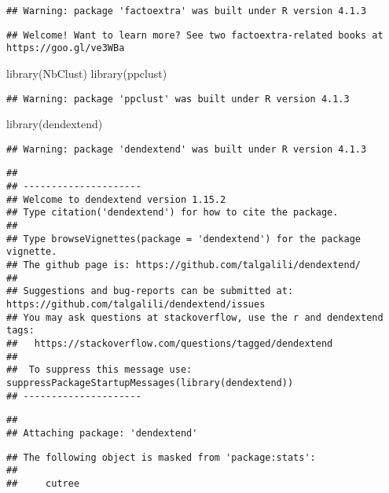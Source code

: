 \documentclass[
]{article}
\newenvironment{Shaded}{\begin{snugshade}}{\end{snugshade}}
\newcommand{\FunctionTok}[1]{\textcolor[rgb]{0.00,0.00,0.00}{#1}}
\newcommand{\NormalTok}[1]{#1}
\begin{document}
\begin{verbatim}
## Warning: package 'factoextra' was built under R version 4.1.3
\end{verbatim}

\begin{verbatim}
## Welcome! Want to learn more? See two factoextra-related books at https://goo.gl/ve3WBa
\end{verbatim}

\begin{Shaded}
\begin{Highlighting}[]
\FunctionTok{library}\NormalTok{(NbClust)}
\FunctionTok{library}\NormalTok{(ppclust)}
\end{Highlighting}
\end{Shaded}

\begin{verbatim}
## Warning: package 'ppclust' was built under R version 4.1.3
\end{verbatim}

\begin{Shaded}
\begin{Highlighting}[]
\FunctionTok{library}\NormalTok{(dendextend)}
\end{Highlighting}
\end{Shaded}

\begin{verbatim}
## Warning: package 'dendextend' was built under R version 4.1.3
\end{verbatim}

\begin{verbatim}
## 
## ---------------------
## Welcome to dendextend version 1.15.2
## Type citation('dendextend') for how to cite the package.
## 
## Type browseVignettes(package = 'dendextend') for the package vignette.
## The github page is: https://github.com/talgalili/dendextend/
## 
## Suggestions and bug-reports can be submitted at: https://github.com/talgalili/dendextend/issues
## You may ask questions at stackoverflow, use the r and dendextend tags: 
##   https://stackoverflow.com/questions/tagged/dendextend
## 
##  To suppress this message use:  suppressPackageStartupMessages(library(dendextend))
## ---------------------
\end{verbatim}

\begin{verbatim}
## 
## Attaching package: 'dendextend'
\end{verbatim}

\begin{verbatim}
## The following object is masked from 'package:stats':
## 
##     cutree
\end{verbatim}
\end{document}
